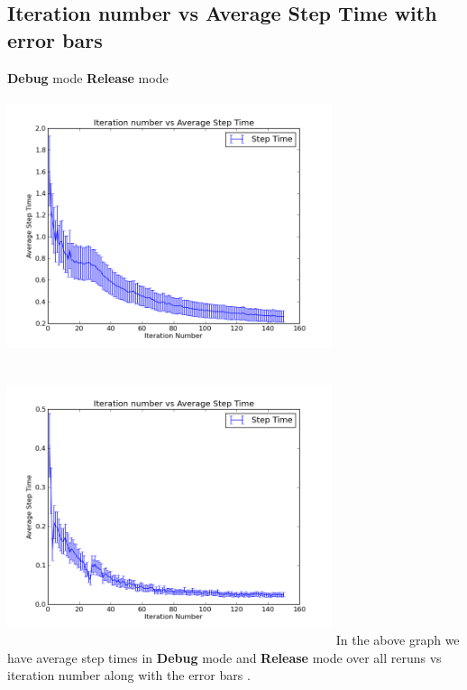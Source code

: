 \documentclass{article}
\begin{document}
\subsection{Iteration number vs Average Step Time with error bars}
\textbf{Debug} mode \hfill \textbf{Release} mode\\
\includegraphics[width=270pt,height=230pt]{g27_lab09_plot03_debug} \hfill  
\includegraphics[width=270pt,height=230pt]{g27_lab09_plot03_release}
In the above graph we have average step times in \textbf{Debug} mode and \textbf{Release} mode over all reruns vs iteration number along with the error bars .
\end{document}
